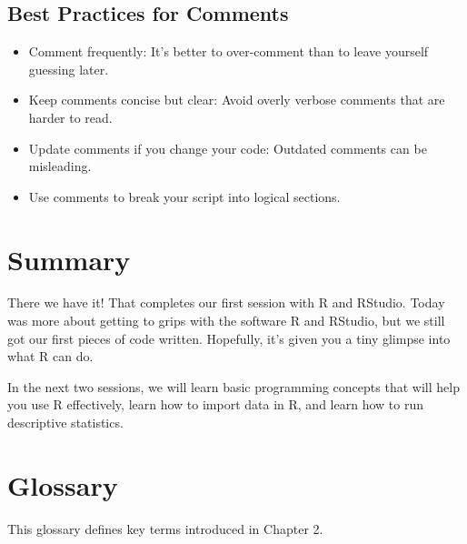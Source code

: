 \documentclass[
]{book}
\begin{document}
\subsection{Best Practices for Comments}\label{best-practices-for-comments}

\begin{itemize}
\item
  Comment frequently: It's better to over-comment than to leave yourself guessing later.
\item
  Keep comments concise but clear: Avoid overly verbose comments that are harder to read.
\item
  Update comments if you change your code: Outdated comments can be misleading.
\item
  Use comments to break your script into logical sections.
\end{itemize}

\section{Summary}\label{summary}

There we have it! That completes our first session with R and RStudio. Today was more about getting to grips with the software R and RStudio, but we still got our first pieces of code written. Hopefully, it's given you a tiny glimpse into what R can do.

In the next two sessions, we will learn basic programming concepts that will help you use R effectively, learn how to import data in R, and learn how to run descriptive statistics.

\section{Glossary}\label{glossary}

This glossary defines key terms introduced in Chapter 2.
\end{document}
